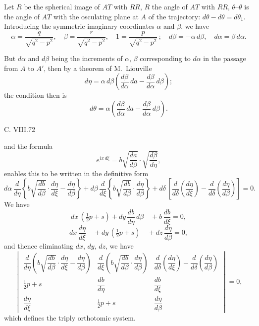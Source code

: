\documentclass[11pt,a4paper]{book}
\begin{document}
\bigskip

Let $R$ be the spherical image of $AT$ with $RR$, $R$ the angle of $AT$ with $RR$, $\theta$--$\theta$ is the
angle of $AT$ with the osculating plane at $A$ of the trajectory: $d\theta - d\theta = d\theta_1$.  Introducing
the symmetric imaginary coordinates $\alpha$ and $\beta$, we have
\[
\alpha = \frac{q}{\sqrt{q^2-p^2}},\quad \beta = \frac{r}{\sqrt{q^2-p^2}},\quad 1 = \frac{p}{\sqrt{q^2-p^2}}\,;\quad d\beta = -\alpha\,d\beta,\quad d\alpha = \beta\,d\alpha.
\]

But $d\alpha$ and $d\beta$ being the increments of $\alpha$, $\beta$ corresponding to $d\alpha$ in the passage
from $A$ to $A'$, then by a theorem of M.~Liouville
\[
d\eta = \alpha\,d\beta \left(\frac{d\beta}{d\alpha}\,da - \frac{d\beta}{d\alpha}\,d\beta\right);
\]
the condition then is
\[
d\theta = \alpha \left(\frac{d\beta}{d\alpha}\,da - \frac{d\beta}{d\alpha}\,d\beta\right).
\]

\vfill
{\small\hfill C. VIII.\hfill 72\hspace{1em}}

\clearpage


\noindent
\hspace*{1em}{\scshape\small 570 \hfill notes and references.\hfill}

\vspace{1em}

\noindent
and the formula
\[
e^{ix\,d\xi} = b\sqrt{\frac{da}{d\beta}}\cdot\sqrt{\frac{d\beta}{d\eta}},
\]
enables this to be written in the definitive form
\[
d\alpha\,\frac{d}{d\eta}\left\{ b\sqrt{\frac{db}{d\beta}}\cdot\frac{d\eta}{d\xi} - \frac{d\eta}{d\beta}\right\}
+ d\beta\,\frac{d}{d\xi}\left\{ b\sqrt{\frac{db}{d\beta}}\cdot\frac{d\eta}{d\beta}\right\}
+ d\delta\,\left[\frac{d}{d\delta}\!\left(\frac{d\eta}{d\xi}\right) - \frac{d}{d\delta}\!\left(\frac{d\eta}{d\beta}\right)\right] = 0.
\]
We have
\[
dx\,(\tfrac{1}{2}p + s) + dy\,\frac{db}{d\eta}\,d\beta\quad + b\,\frac{db}{d\xi} = 0,
\]
\[
dx\,\frac{d\eta}{d\xi}\quad + dy\,(\tfrac{1}{2}p + s)\quad + dz\,\frac{d\eta}{d\beta} = 0,
\]
and thence eliminating $dx$, $dy$, $dz$, we have
\[
\begin{vmatrix}
\dfrac{d}{d\eta}\!\left(b\sqrt{\dfrac{db}{d\beta}}\cdot\dfrac{d\eta}{d\xi} - \dfrac{d\eta}{d\beta}\right)
& \dfrac{d}{d\xi}\!\left(b\sqrt{\dfrac{db}{d\beta}}\cdot\dfrac{d\eta}{d\beta}\right)
& \dfrac{d}{d\delta}\!\left(\dfrac{d\eta}{d\xi}\right) - \dfrac{d}{d\delta}\!\left(\dfrac{d\eta}{d\beta}\right)\\[1.2em]
\tfrac{1}{2}p + s & \dfrac{db}{d\eta} & \dfrac{db}{d\xi}\\[0.8em]
\dfrac{d\eta}{d\xi} & \tfrac{1}{2}p + s & \dfrac{d\eta}{d\beta}
\end{vmatrix} = 0,
\]
which defines the triply orthotomic system.
\end{document}
